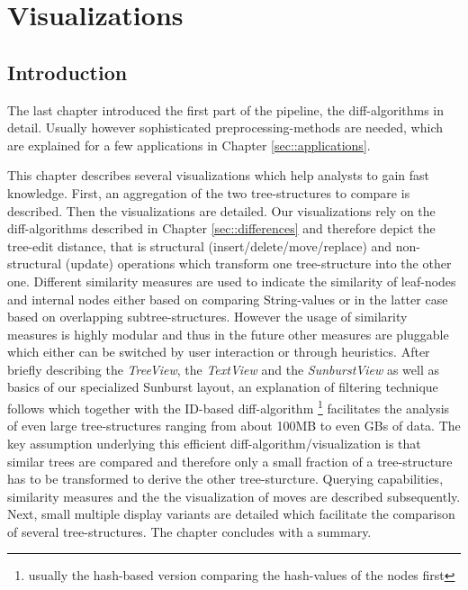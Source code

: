 \section{Visualizations}\label{sec::visualizations}
\subsection{Introduction}
The last chapter introduced the first part of the pipeline, the diff-algorithms in detail. Usually however sophisticated preprocessing-methods are needed, which are explained for a few applications in Chapter \ref{sec::applications}.

This chapter describes several visualizations which help analysts to gain fast knowledge. First, an aggregation of the two tree-structures to compare is described. Then the visualizations are detailed. Our visualizations rely on the diff-algorithms described in Chapter \ref{sec::differences} and therefore depict the tree-edit distance, that is structural (insert/delete/move/replace) and non-structural (update) operations which transform one tree-structure into the other one. Different similarity measures are used to indicate the similarity of leaf-nodes and internal nodes either based on comparing String-values or in the latter case based on overlapping subtree-structures. However the usage of similarity measures is highly modular and thus in the future other measures are pluggable which either can be switched by user interaction or through heuristics. After briefly describing the \emph{TreeView}, the \emph{TextView} and the \emph{SunburstView} as well as basics of our specialized Sunburst layout, an explanation of filtering technique follows which together with the ID-based diff-algorithm \footnote{usually the hash-based version comparing the hash-values of the nodes first} facilitates the analysis of even large tree-structures ranging from about 100MB to even GBs of data. The key assumption underlying this efficient diff-algorithm/visualization is that similar trees are compared and therefore only a small fraction of a tree-structure has to be transformed to derive the other tree-sturcture. Querying capabilities, similarity measures and the the visualization of moves are described subsequently. Next, small multiple display variants are detailed which facilitate the comparison of several tree-structures. The chapter concludes with a summary.

